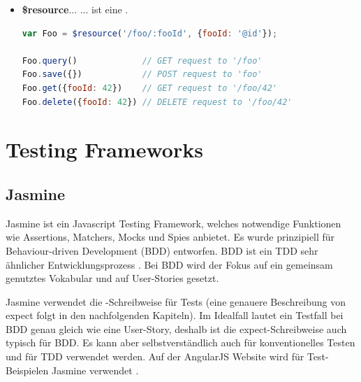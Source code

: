 \begin{itemize}
  \newpage
  \item \textbf{\$resource}...\linebreak
      ... ist eine  \autocite[\$resource]{Angular:APIRef}.

      \begin{lstlisting}[language=JavaScript, caption=AngularJS - {\$resource}]
var Foo = $resource('/foo/:fooId', {fooId: '@id'});

Foo.query()             // GET request to '/foo'
Foo.save({})            // POST request to 'foo'
Foo.get({fooId: 42})    // GET request to '/foo/42'
Foo.delete({fooId: 42}) // DELETE request to '/foo/42'
      \end{lstlisting}

\end{itemize}

\newpage
\section{Testing Frameworks}

\subsection{Jasmine}
Jasmine ist ein Javascript Testing Framework, welches notwendige Funktionen wie Assertions, Matchers, Mocks und Spies anbietet. Es wurde prinzipiell für Behaviour-driven Development (BDD) entworfen. BDD ist ein TDD sehr ähnlicher Entwicklungsprozess \autocite[34]{Johansen:2011}. Bei BDD wird der Fokus auf ein gemeinsam genutztes Vokabular und auf User-Stories gesetzt.

Jasmine verwendet die -Schreibweise für Tests (eine genauere Beschreibung von expect folgt in den nachfolgenden Kapiteln). Im Idealfall lautet ein Testfall bei BDD genau gleich wie eine User-Story, deshalb ist die expect-Schreibweise auch typisch für BDD. Es kann aber selbstverständlich auch für konventionelles Testen und für TDD verwendet werden. Auf der AngularJS Website wird für Test-Beispielen Jasmine verwendet \autocite[Unit Testing]{Angular:DevGuide}.

